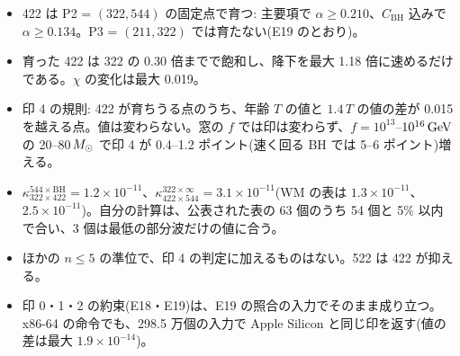\begin{result}
\begin{itemize}
\item 422 は P2 = $(322,544)$ の固定点で育つ: 主要項で $\alpha\ge0.210$、$C_\mathrm{BH}$ 込みで $\alpha\ge0.134$。P3 = $(211,322)$ では育たない(E19 のとおり)。
\item 育った 422 は 322 の 0.30 倍までで飽和し、降下を最大 1.18 倍に速めるだけである。$\chi$ の変化は最大 0.019。
\item 印 4 の規則: 422 が育ちうる点のうち、年齢 $T$ の値と $1.4\,T$ の値の差が 0.015 を越える点。値は変わらない。窓の $f$ では印は変わらず、$f=10^{13}$--$10^{16}\,\mathrm{GeV}$ の 20--80$\,M_\odot$ で印 4 が 0.4--1.2 ポイント(速く回る BH では 5--6 ポイント)増える。
\item $\kappa^{544\times\mathrm{BH}}_{322\times422}=1.2\times10^{-11}$、$\kappa^{322\times\infty}_{422\times544}=3.1\times10^{-11}$(WM の表は $1.3\times10^{-11}$、$2.5\times10^{-11}$)。自分の計算は、公表された表の 63 個のうち 54 個と 5\% 以内で合い、3 個は最低の部分波だけの値に合う。
\item ほかの $n\le5$ の準位で、印 4 の判定に加えるものはない。522 は 422 が抑える。
\item 印 0・1・2 の約束(E18・E19)は、E19 の照合の入力でそのまま成り立つ。x86-64 の命令でも、298.5 万個の入力で Apple Silicon と同じ印を返す(値の差は最大 $1.9\times10^{-14}$)。
\end{itemize}
\end{result}

